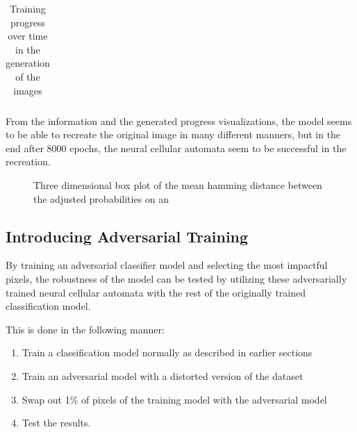 \documentclass[conference]{IEEEtran}
\begin{document}
\begin{table}[ht]
\begin{tabular}{cc}
\end{tabular}
\caption{Training progress over time in the generation of the images}
\end{table}

From the information and the generated progress visualizations, the model seems to be able to recreate the original image in many different manners, but in the end after 8000 epochs, the neural cellular automata seem to be successful in the recreation. 


\begin{figure}[htbp]
\caption{Three dimensional box plot of the mean hamming distance between the adjusted probabilities on an }
\end{figure}

\subsection{Introducing Adversarial Training}

By training an adversarial classifier model and selecting the most impactful pixels, the robustness of the model can be tested by utilizing these adversarially trained neural cellular automata with the rest of the originally trained classification model. 

This is done in the following manner:
\begin{enumerate}
    \item Train a classification model normally as described in earlier sections
    \item Train an adversarial model with a distorted version of the dataset
    \item Swap out 1\% of pixels of the training model with the adversarial model
    \item Test the results.
\end{enumerate}
\end{document}
